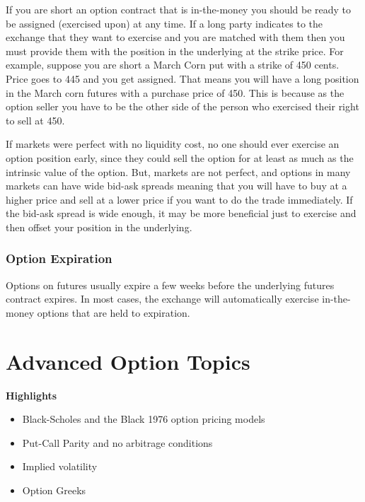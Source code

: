 \documentclass[
]{book}
\begin{document}
If you are short an option contract that is in-the-money you should be ready to be assigned (exercised upon) at any time. If a long party indicates to the exchange that they want to exercise and you are matched with them then you must provide them with the position in the underlying at the strike price. For example, suppose you are short a March Corn put with a strike of 450 cents. Price goes to 445 and you get assigned. That means you will have a long position in the March corn futures with a purchase price of 450. This is because as the option seller you have to be the other side of the person who exercised their right to sell at 450.

If markets were perfect with no liquidity cost, no one should ever exercise an option position early, since they could sell the option for at least as much as the intrinsic value of the option. But, markets are not perfect, and options in many markets can have wide bid-ask spreads meaning that you will have to buy at a higher price and sell at a lower price if you want to do the trade immediately. If the bid-ask spread is wide enough, it may be more beneficial just to exercise and then offset your position in the underlying.

\hypertarget{option-expiration}{%
\subsection{Option Expiration}\label{option-expiration}}

Options on futures usually expire a few weeks before the underlying futures contract expires. In most cases, the exchange will automatically exercise in-the-money options that are held to expiration.

\hypertarget{advanced-option-topics}{%
\chapter{Advanced Option Topics}\label{advanced-option-topics}}

\textbf{Highlights}

\begin{itemize}
\item
  Black-Scholes and the Black 1976 option pricing models
\item
  Put-Call Parity and no arbitrage conditions
\item
  Implied volatility
\item
  Option Greeks
\end{itemize}
\end{document}
